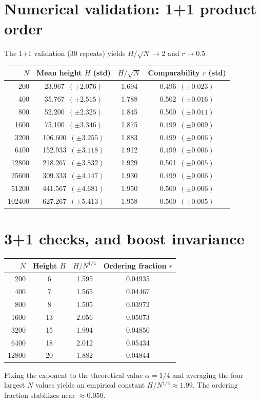 \documentclass[12pt,a4paper]{article}
\begin{document}
\section{Numerical validation: 1+1 product order}\label{app:1p1table}
The 1+1 validation (30 repeats) yields $H/\sqrt{N}\to 2$ and $r\to 0.5$
\begin{center}
\begin{tabular}{rccc}
\hline
$N$ & Mean height $H$ (std) & $H/\sqrt{N}$ & Comparability $r$ (std)\\\hline
200 & 23.967 $\, (\pm 2.076)$ & 1.694 & 0.496 $\, (\pm 0.023)$ \\
400 & 35.767 $\, (\pm 2.515)$ & 1.788 & 0.502 $\, (\pm 0.016)$ \\
800 & 52.200 $\, (\pm 2.325)$ & 1.845 & 0.500 $\, (\pm 0.011)$ \\
1600 & 75.100 $\, (\pm 3.346)$ & 1.875 & 0.499 $\, (\pm 0.009)$ \\
3200 & 106.600 $\, (\pm 3.255)$ & 1.883 & 0.499 $\, (\pm 0.006)$ \\
6400 & 152.933 $\, (\pm 3.118)$ & 1.912 & 0.499 $\, (\pm 0.006)$ \\
12800 & 218.267 $\, (\pm 3.832)$ & 1.929 & 0.501 $\, (\pm 0.005)$ \\
25600 & 309.333 $\, (\pm 4.147)$ & 1.930 & 0.499 $\, (\pm 0.006)$ \\
51200 & 441.567 $\, (\pm 4.681)$ & 1.950 & 0.500 $\, (\pm 0.006)$ \\
102400 & 627.267 $\, (\pm 5.413)$ & 1.958 & 0.500 $\, (\pm 0.005)$ \\
\hline
\end{tabular}
\end{center}

\section{3+1 checks, and boost invariance}\label{app:3p1}
\begin{center}
\begin{tabular}{rccc}
\hline
$N$ & Height $H$ & $H/N^{1/4}$ & Ordering fraction $r$ \\\hline
200 & 6 & 1.595 & 0.04935 \\
400 & 7 & 1.565 & 0.04467 \\
800 & 8 & 1.505 & 0.03972 \\
1600 & 13 & 2.056 & 0.05073 \\
3200 & 15 & 1.994 & 0.04850 \\
6400 & 18 & 2.012 & 0.05434 \\
12800 & 20 & 1.882 & 0.04844 \\
\hline
\end{tabular}
\end{center}
Fixing the exponent to the theoretical value $\alpha=1/4$ and averaging the four largest $N$ values yields an empirical constant $H/N^{1/4}\approx 1.99$. The ordering fraction stabilizes near $\approx 0.050$.
\end{document}
